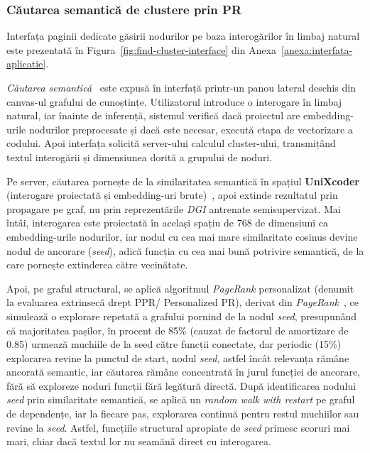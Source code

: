 \documentclass[12pt]{article}
\numberwithin{equation}{section}
\numberwithin{figure}{section}
\numberwithin{table}{section}
\theoremstyle{definition}
\theoremstyle{plain}
\newcounter{anexa}
\begin{document}
\subsubsection{Căutarea semantică de clustere prin PR}

Interfața paginii dedicate găsirii nodurilor pe baza interogărilor în limbaj natural este prezentată în Figura~\ref{fig:find-cluster-interface} din Anexa~\ref{anexa:interfata-aplicatie}.

\textit{Căutarea semantică}~\cite{husain2019codesearchnet} este expusă în interfață printr-un panou lateral deschis din canvas-ul grafului de cunoștințe. Utilizatorul introduce o interogare în limbaj natural, iar înainte de inferență, sistemul verifică dacă proiectul are embedding-urile nodurilor preprocesate și dacă este necesar, execută etapa de vectorizare a codului. Apoi interfața solicită server-ului calculul cluster-ului, transmițând textul interogării și dimensiunea dorită a grupului de noduri.

Pe server, căutarea pornește de la similaritatea semantică în spațiul \textbf{UniXcoder} (interogare proiectată și embedding-uri brute)~\cite{guo2022unixcoder}, apoi extinde rezultatul prin propagare pe graf, nu prin reprezentările \textit{DGI} antrenate semisupervizat. Mai întâi, interogarea este proiectată în același spațiu de 768 de dimensiuni ca embedding-urile nodurilor, iar nodul cu cea mai mare similaritate cosinus devine nodul de ancorare (\textit{seed}), adică funcția cu cea mai bună potrivire semantică, de la care pornește extinderea către vecinătate.

Apoi, pe graful structural, se aplică algoritmul \textit{PageRank} personalizat (denumit la evaluarea extrinsecă drept PPR/ Personalized PR), derivat din \textit{PageRank}~\cite{page1999pagerank}, ce simulează o explorare repetată a grafului pornind de la nodul \textit{seed}, presupunând că majoritatea pașilor, în procent de 85\% (cauzat de factorul de amortizare de 0.85) urmează muchiile de la seed către funcții conectate, dar periodic (15\%) explorarea revine la punctul de start, nodul \textit{seed}, astfel încât relevanța rămâne ancorată semantic, iar căutarea rămâne concentrată în jurul funcției de ancorare, fără să exploreze noduri funcții fără legătură directă. După identificarea nodului \textit{seed} prin similaritate semantică, se aplică un \textit{random walk with restart} pe graful de dependențe, iar la fiecare pas, explorarea continuă pentru restul muchiilor sau revine la \textit{seed}. Astfel, funcțiile structural apropiate de \textit{seed} primesc scoruri mai mari, chiar dacă textul lor nu seamănă direct cu interogarea.
\end{document}
